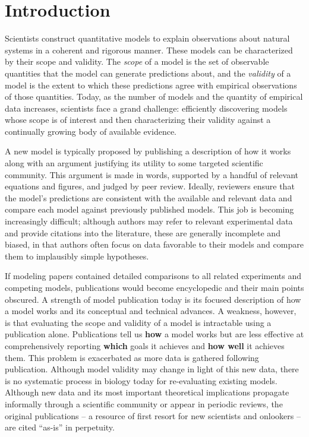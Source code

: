 \documentclass[11pt,letterpaper]{article}
\begin{document}
\section{Introduction}
Scientists construct quantitative models to explain observations about natural systems in a coherent and rigorous manner. These models can be characterized by their scope and validity. The \textit{scope} of a model is the set of observable quantities that the model can generate predictions about, and the \textit{validity} of a model is the extent to which these predictions agree with empirical observations of those quantities. Today, as the number of models and the quantity of empirical data increases, scientists face a grand challenge: efficiently discovering models whose scope is of interest and then characterizing their validity against a continually growing body of available evidence. 

A new model is typically proposed by publishing a description of how it works along with an argument justifying its utility to some targeted scientific community. This argument is made in words, supported by a handful of relevant equations and figures, and judged by peer review. Ideally, reviewers ensure that the model's predictions are consistent with the available and relevant data and compare each model against previously published models. This job is becoming increasingly difficult; although authors may refer to relevant experimental data and provide citations into the literature, these are generally incomplete and biased, in that authors often focus on data favorable to their models and compare them to implausibly simple hypotheses.

If modeling papers contained detailed comparisons to all related experiments and competing models, publications would become encyclopedic and their main points obscured. A strength of model publication today is its focused description of how a model works and its conceptual and technical advances. A weakness, however, is that evaluating the scope and validity of a model is intractable using a publication alone. Publications tell us \textbf{how} a model works but are less effective at comprehensively reporting \textbf{which} goals it achieves and \textbf{how well} it achieves them. This problem is exacerbated as more data is gathered following publication. Although model validity may change in light of this new data, there is no systematic process in biology today for re-evaluating existing models. Although new data and its most important theoretical implications propagate informally through a scientific community or appear in periodic reviews, the original publications -- a resource of first resort for new scientists and onlookers -- are cited ``as-is'' in perpetuity. 	
\end{document}
